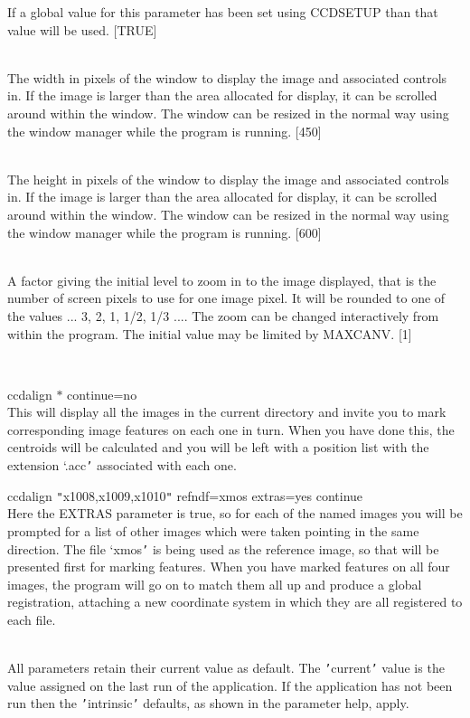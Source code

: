 \documentclass[twoside,11pt]{article}
\newcommand{\htmlref}[2]{#1}
\renewcommand{\_}{\texttt{\symbol{95}}}
\newcommand{\xroutine}[1]{\htmlref{{\sc #1}}{#1}}
\newcommand{\sstexamples}[1]{
   \item[Examples:] \mbox{} \\
   \vspace{-3.5ex}
   \begin{description}
      #1
   \end{description}
}
\newcommand{\sstsubsection}[1]{ \item[{#1}] \mbox{} \\}
\newcommand{\sstexamplesubsection}[2]{\sloppy \item{\ssttt #1} \mbox{} \\ #2 }
\newcommand{\sstdiytopic}[2]{\item[#1:] \mbox{} \\[1.3ex] #2}
\newcommand{\sstexamples}[1]{
      \item[Examples:] \\
      \begin{description}
         #1
      \end{description}
      \\
   }
\newcommand{\sstsubsection}[1]{\item[{#1}]}
\newcommand{\sstexamplesubsection}[2]{\item[{\ssttt #1}] #2}
\newcommand{\sstdiytopic}[2]{\item[{#1}] #2 }
\begin{document}
{{{         If a global value for this parameter has been set using
         \xroutine{CCDSETUP} than that value will be used.
         [TRUE]
      }
      \sstsubsection{
         WINX = INTEGER (Read and Write)
      }{
         The width in pixels of the window to display the image and
         associated controls in.  If the image is larger than the area
         allocated for display, it can be scrolled around within the
         window.  The window can be resized in the normal way using
         the window manager while the program is running.
         [450]
      }
      \sstsubsection{
         WINY = INTEGER (Read and Write)
      }{
         The height in pixels of the window to display the image and
         associated controls in.  If the image is larger than the area
         allocated for display, it can be scrolled around within the
         window.  The window can be resized in the normal way using
         the window manager while the program is running.
         [600]
      }
      \sstsubsection{
         ZOOM = DOUBLE (Read and Write)
      }{
         A factor giving the initial level to zoom in to the image
         displayed, that is the number of screen pixels to use for one
         image pixel.  It will be rounded to one of the values
         ... 3, 2, 1, 1/2, 1/3 ....  The zoom can be changed
         interactively from within the program.  The initial value
         may be limited by MAXCANV.
         [1]
      }
   }
   \sstexamples{
      \sstexamplesubsection{
         ccdalign $*$ continue=no
      }{
         This will display all the images in the current directory and
         invite you to mark corresponding image features on each one
         in turn.  When you have done this, the centroids will be
         calculated and you will be left with a position list with
         the extension `.acc{\tt '} associated with each one.
      }
      \sstexamplesubsection{
         ccdalign {\tt "}x1008,x1009,x1010{\tt "} refndf=xmos extras=yes continue
      }{
         Here the EXTRAS parameter is true, so for each of the named
         images you will be prompted for a list of other images
         which were taken pointing in the same direction.
         The file `xmos{\tt '} is being used as the reference image,
         so that will be presented first for marking features.
         When you have marked features on all four images, the
         program will go on to match them all up and produce a
         global registration, attaching a new coordinate system in
         which they are all registered to each file.
      }
   }
   \sstdiytopic{
      Behaviour of parameters
   }{
      All parameters retain their current value as default. The
      {\tt '}current{\tt '} value is the value assigned on the last run of the
      application. If the application has not been run then the
      {\tt '}intrinsic{\tt '} defaults, as shown in the parameter help, apply.

}}
\end{document}
